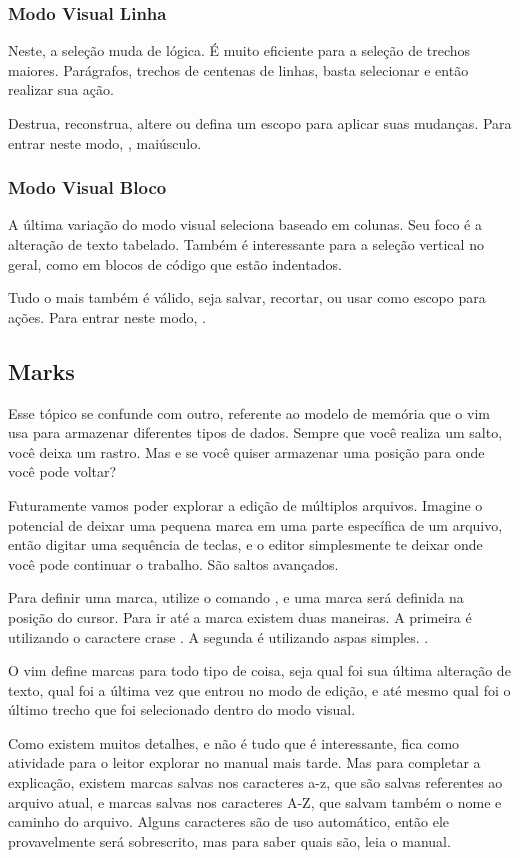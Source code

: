 \documentclass[a4paper, 12pt]{article}
\begin{document}
\subsubsection{Modo Visual Linha}
Neste, a seleção muda de lógica.
É muito eficiente para a seleção de trechos maiores.
Parágrafos, trechos de centenas de linhas, basta selecionar e então realizar sua ação.

Destrua, reconstrua, altere ou defina um escopo para aplicar suas mudanças.
Para entrar neste modo, , maiúsculo.

\subsubsection{Modo Visual Bloco}
A última variação do modo visual seleciona baseado em colunas.
Seu foco é a alteração de texto tabelado.
Também é interessante para a seleção vertical no geral, como em blocos de código que estão indentados.

Tudo o mais também é válido, seja salvar, recortar, ou usar como escopo para ações.
Para entrar neste modo, .

\subsection{Marks}
Esse tópico se confunde com outro, referente ao modelo de memória que o vim usa para armazenar diferentes tipos de dados.
Sempre que você realiza um salto, você deixa um rastro.
Mas e se você quiser armazenar uma posição para onde você pode voltar?

Futuramente vamos poder explorar a edição de múltiplos arquivos.
Imagine o potencial de deixar uma pequena marca em uma parte específica de um arquivo,
então digitar uma sequência de teclas, e o editor simplesmente te deixar onde você pode continuar o trabalho.
São saltos avançados.

Para definir uma marca, utilize o comando , e uma marca será definida na posição do cursor.
Para ir até a marca existem duas maneiras.
A primeira é utilizando o caractere crase \vimcommand{\`}.
A segunda é utilizando aspas simples. .

O vim define marcas para todo tipo de coisa, seja qual foi sua última alteração de texto,
qual foi a última vez que entrou no modo de edição,
e até mesmo qual foi o último trecho que foi selecionado dentro do modo visual.

Como existem muitos detalhes, e não é tudo que é interessante, fica como atividade para o leitor explorar no manual mais tarde.
Mas para completar a explicação, existem marcas salvas nos caracteres a-z, 
que são salvas referentes ao arquivo atual, e marcas salvas nos caracteres A-Z,
que salvam também o nome e caminho do arquivo.
Alguns caracteres são de uso automático, então ele provavelmente será sobrescrito, mas para saber quais são, leia o manual.
\end{document}

